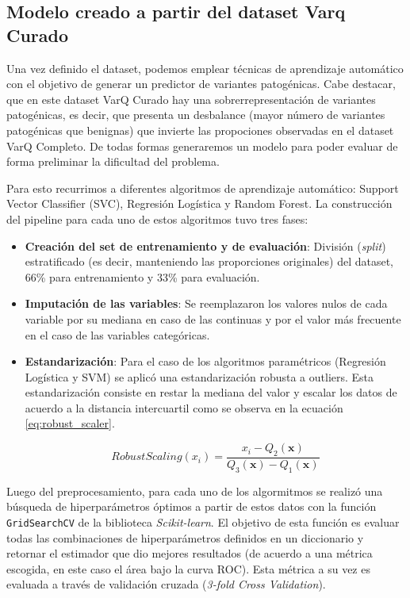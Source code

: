 \newpage

\subsection{Modelo creado a partir del dataset Varq Curado}

Una vez definido el dataset, podemos emplear técnicas de aprendizaje automático con el objetivo de generar un predictor de variantes patogénicas. Cabe destacar, que en este dataset VarQ Curado hay una sobrerrepresentación de variantes patogénicas, es decir, que presenta un desbalance (mayor número de variantes patogénicas que benignas) que invierte las propociones observadas en el dataset VarQ Completo. De todas formas generaremos un modelo para poder evaluar de forma preliminar la dificultad del problema. 

Para esto recurrimos a diferentes algoritmos de aprendizaje automático: Support Vector Classifier (SVC), Regresión Logística y Random Forest. La construcción del pipeline para cada uno de estos algoritmos tuvo tres fases: 

\begin{itemize}
    \item \textbf{Creación del set de entrenamiento y de evaluación}: División (\textit{split}) estratificado (es decir, manteniendo las proporciones originales) del dataset, 66\% para entrenamiento y 33\% para evaluación. 
    \item \textbf{Imputación de las variables}: Se reemplazaron los valores nulos de cada variable por su mediana en caso de las continuas y por el valor más frecuente en el caso de las variables categóricas.
    \item \textbf{Estandarización}: Para el caso de los algoritmos paramétricos (Regresión Logística y SVM) se aplicó una estandarización robusta a outliers. Esta estandarización consiste en restar la mediana del valor y escalar los datos de acuerdo a la distancia intercuartil como se observa en la ecuación \ref{eq:robust_scaler}.
    
    \begin{equation}
        RobustScaling(x_i) = \frac{x_i - Q_2(\textbf{x})}{Q_3(\textbf{x}) - Q_1(\textbf{x})} 
        \label{eq:robust_scaler}
    \end{equation}
    
    
    
\end{itemize}

Luego del preprocesamiento, para cada uno de los algormitmos se realizó una búsqueda de hiperparámetros óptimos a partir de estos datos con la función \texttt{GridSearchCV} de la biblioteca \textit{Scikit-learn}. El objetivo de esta función es evaluar todas las combinaciones de hiperparámetros definidos en un diccionario y retornar el estimador que dio mejores resultados (de acuerdo a una métrica escogida, en este caso el área bajo la curva ROC). Esta métrica a su vez es evaluada a través de validación cruzada (\textit{3-fold Cross Validation}). 

